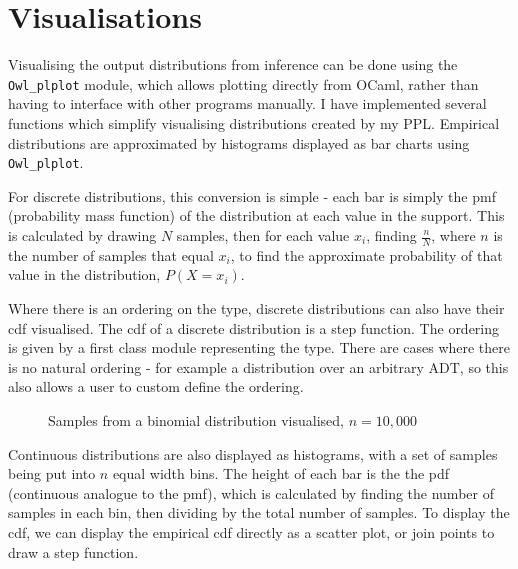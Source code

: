 \section{Visualisations}
Visualising the output distributions from inference can be done using the \texttt{Owl\_plplot} module, which allows plotting directly from OCaml, rather than having to interface with other programs manually. I have implemented several functions which simplify visualising distributions created by my PPL. Empirical distributions are approximated by histograms displayed as bar charts using \texttt{Owl\_plplot}.
	
For discrete distributions, this conversion is simple - each bar is simply the pmf (probability mass function) of the distribution at each value in the support. This is calculated by drawing $N$ samples, then for each value $x_i$, finding $\frac{n}{N}$, where $n$ is the number of samples that equal $x_i$, to find the approximate probability of that value in the distribution, $P(X = x_i)$.
	
Where there is an ordering on the type, discrete distributions can also have their cdf visualised. The cdf of a discrete distribution is a step function. The ordering is given by a first class module representing the type. There are cases where there is no natural ordering - for example a distribution over an arbitrary ADT, so this also allows a user to custom define the ordering.
% 
\begin{figure}[!htb]
	\centering
	\qquad
	\caption{Samples from a binomial distribution visualised, $n=10,000$}
	\label{fig:vis-binom}
\end{figure}
% 
Continuous distributions are also displayed as histograms, with a set of samples being put into $n$ equal width bins. The height of each bar is the the pdf (continuous analogue to the pmf), which is calculated by finding the number of samples in each bin, then dividing by the total number of samples. To display the cdf, we can display the empirical cdf directly as a scatter plot, or join points to draw a step function.
	

